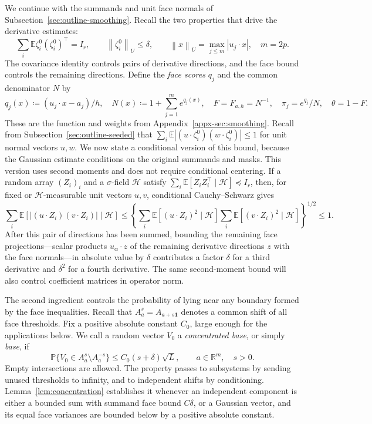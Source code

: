 \documentclass[11pt,letterpaper]{article}
\theoremstyle{remark}
\newcommand{\E}{\mathbb E}
\newcommand{\Pp}{\mathbb P}
\newcommand{\R}{\mathbb R}
\newcommand{\norm}[1]{\left\lVert#1\right\rVert}
\begin{document}
We continue with the summands and unit face normals of
Subsection~\ref{sec:outline-smoothing}. Recall the two properties
that drive the derivative estimates:
\begin{equation}
 \sum_i\E\zeta_i^0(\zeta_i^0)^\top=I_r,
 \qquad \norm{\zeta_i^0}_U\le\delta,
 \qquad \norm x_U=\max_{j\le m}|u_j\cdot x|,
 \quad m=2p.
 \label{appx-eq:projected-bound}
\end{equation}
The covariance identity controls pairs of derivative directions,
and the face bound controls the remaining directions. Define the
\emph{face scores} \(q_j\) and the common denominator \(N\) by
\begin{equation}
 \label{appx-an:basic-notation}
 q_j(x)\coloneqq(u_j\cdot x-a_j)/h,\quad
 N(x)\coloneqq1+\sum_{j=1}^m e^{q_j(x)},\quad
 F=F_{a,h}=N^{-1},\quad\pi_j=e^{q_j}/N,\quad\theta=1-F.
\end{equation}
These are the function and weights from Appendix~\ref{appx-sec:smoothing}.
{Recall from Subsection~\ref{sec:outline-seeded} that
\(\sum_i\E|(u\cdot\zeta_i^0)(w\cdot\zeta_i^0)|\le1\)
for unit normal vectors \(u,w\). We now state a conditional version of
this bound, because the Gaussian estimate conditions on the original
summands and masks. This version uses second moments and does not
require conditional centering.} If a random array \((Z_i)_i\)
and a \(\sigma\)-field \(\mathcal H\) satisfy
\(\sum_i\E[Z_iZ_i^\top\mid\mathcal H]\preceq I_r\), then, for
fixed or \(\mathcal H\)-measurable unit vectors \(u,v\),
conditional Cauchy--Schwarz gives
\begin{equation}
 \sum_i\E[|(u\cdot Z_i)(v\cdot Z_i)|\mid\mathcal H]
 \le\left\{\sum_i\E[(u\cdot Z_i)^2\mid\mathcal H]
           \sum_i\E[(v\cdot Z_i)^2\mid\mathcal H]\right\}^{1/2}
 \le1.
 \label{appx-an:pair-contraction}
\end{equation}
After this pair of directions has been summed, bounding the remaining
{
face projections---scalar products \(u_\alpha\cdot z\) of the remaining
derivative directions \(z\) with the face normals---in absolute value
by \(\delta\) contributes a factor \(\delta\)
}
for a third derivative and \(\delta^2\) for a fourth derivative.
The same second-moment bound will also control coefficient matrices
in operator norm.

The second ingredient controls the probability of lying near any
boundary formed by the face inequalities. {Recall that
\(A_a^s=A_{a+s\mathbf1}\) denotes a common shift of all face thresholds.}
Fix a positive absolute
constant \(C_0\), large enough for the applications below. We call
a random vector \(V_0\) a \emph{concentrated base}{, or simply \emph{base}}, if
\begin{equation}
 \Pp\{V_0\in A_a^s\setminus A_a^{-s}\}
 \le C_0(s+\delta)\sqrt L,
 \qquad a\in\R^m,\quad s>0.
 \label{appx-an:concentration}
\end{equation}
Empty intersections are allowed. The property passes to subsystems
by sending unused thresholds to infinity, and to independent shifts
by conditioning. Lemma~\ref{lem:concentration} establishes it whenever an independent component is
either a bounded sum with summand face bound \(C\delta\), or a
Gaussian vector, and its equal face variances are bounded below by
a positive absolute constant.
\end{document}
